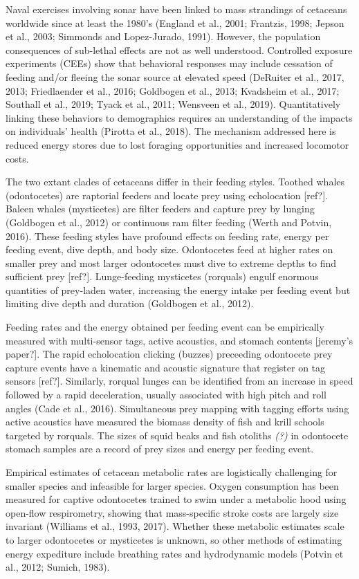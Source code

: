 \documentclass[]{elsarticle} %
\begin{document}
Naval exercises involving sonar have been linked to mass strandings of
cetaceans worldwide since at least the 1980's (England et al., 2001;
Frantzis, 1998; Jepson et al., 2003; Simmonds and Lopez-Jurado, 1991).
However, the population consequences of sub-lethal effects are not as
well understood. Controlled exposure experiments (CEEs) show that
behavioral responses may include cessation of feeding and/or fleeing the
sonar source at elevated speed (DeRuiter et al., 2017, 2013;
Friedlaender et al., 2016; Goldbogen et al., 2013; Kvadsheim et al.,
2017; Southall et al., 2019; Tyack et al., 2011; Wensveen et al., 2019).
Quantitatively linking these behaviors to demographics requires an
understanding of the impacts on individuals' health (Pirotta et al.,
2018). The mechanism addressed here is reduced energy stores due to lost
foraging opportunities and increased locomotor costs.

The two extant clades of cetaceans differ in their feeding styles.
Toothed whales (odontocetes) are raptorial feeders and locate prey using
echolocation {[}ref?{]}. Baleen whales (mysticetes) are filter feeders
and capture prey by lunging (Goldbogen et al., 2012) or continuous ram
filter feeding (Werth and Potvin, 2016). These feeding styles have
profound effects on feeding rate, energy per feeding event, dive depth,
and body size. Odontocetes feed at higher rates on smaller prey and most
larger odontocetes must dive to extreme depths to find sufficient prey
{[}ref?{]}. Lunge-feeding mysticetes (rorquals) engulf enormous
quantities of prey-laden water, increasing the energy intake per feeding
event but limiting dive depth and duration (Goldbogen et al., 2012).

Feeding rates and the energy obtained per feeding event can be
empirically measured with multi-sensor tags, active acoustics, and
stomach contents {[}jeremy's paper?{]}. The rapid echolocation clicking
(buzzes) preceeding odontocete prey capture events have a kinematic and
acoustic signature that register on tag sensors {[}ref?{]}. Similarly,
rorqual lunges can be identified from an increase in speed followed by a
rapid deceleration, usually associated with high pitch and roll angles
(Cade et al., 2016). Simultaneous prey mapping with tagging efforts
using active acoustics have measured the biomass density of fish and
krill schools targeted by rorquals. The sizes of squid beaks and fish
otoliths \emph{(?)} in odontocete stomach samples are a record of prey
sizes and energy per feeding event.

Empirical estimates of cetacean metabolic rates are logistically
challenging for smaller species and infeasible for larger species.
Oxygen consumption has been measured for captive odontocetes trained to
swim under a metabolic hood using open-flow respirometry, showing that
mass-specific stroke costs are largely size invariant (Williams et al.,
1993, 2017). Whether these metabolic estimates scale to larger
odontocetes or mysticetes is unknown, so other methods of estimating
energy expediture include breathing rates and hydrodynamic models
(Potvin et al., 2012; Sumich, 1983).
\end{document}
